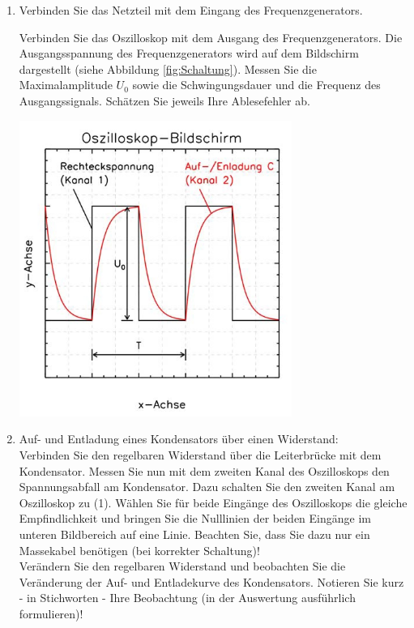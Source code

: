 \begin{enumerate}
 \item Verbinden Sie das Netzteil mit dem Eingang des Frequenzgenerators. \\
	\begin{minipage}{0.45\textwidth}
		Verbinden Sie das Oszilloskop mit dem Ausgang des Frequenzgenerators. Die Ausgangsspannung des Frequenzgenerators wird auf dem Bildschirm dargestellt (siehe Abbildung \ref{fig:Schaltung}). Messen Sie die Maximalamplitude 
		$U_0$ sowie die Schwingungsdauer und die Frequenz des Ausgangssignals. Schätzen Sie jeweils Ihre Ablesefehler ab.
	\end{minipage} 
	\hfill
	\begin{minipage}{0.45\textwidth}
		\raggedright
			\includegraphics[width=0.7\textwidth]{Versuch_15-16/Abbildungen/Oszi.jpg}
			\label{fig:Oszi}
	\end{minipage}
 \item Auf- und Entladung eines Kondensators über einen Widerstand:\\
	Verbinden Sie den regelbaren Widerstand über die Leiterbrücke mit dem Kondensator. Messen Sie nun mit dem zweiten Kanal des Oszilloskops den Spannungsabfall am Kondensator. Dazu schalten Sie den
	zweiten Kanal am Oszilloskop zu (1). Wählen Sie für beide Eingänge des Oszilloskops die gleiche Empfindlichkeit und bringen Sie die Nulllinien der beiden Eingänge im unteren Bildbereich auf eine Linie. Beachten Sie, dass Sie dazu nur ein Massekabel benötigen (bei korrekter Schaltung)!\\
	Verändern Sie den regelbaren Widerstand und beobachten Sie die Veränderung der Auf- und Entladekurve des Kondensators. Notieren Sie kurz - in Stichworten - Ihre Beobachtung (in der Auswertung ausführlich formulieren)!

\end{enumerate}
